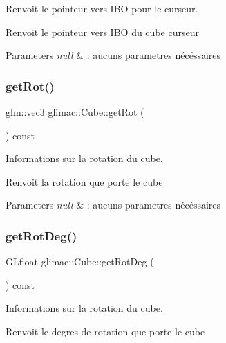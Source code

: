 Renvoit le pointeur vers I\+BO pour le curseur. 

Renvoit le pointeur vers I\+BO du cube curseur


\begin{DoxyParams}{Parameters}
{\em null} & \+: aucuns parametres nécéssaires \\
\hline
\end{DoxyParams}
\mbox{\label{classglimac_1_1Cube_a64f331e9a047ac8f9fe9f20e19a2c8e4}} 
\subsubsection{\texorpdfstring{get\+Rot()}{getRot()}}
{\footnotesize\ttfamily glm\+::vec3 glimac\+::\+Cube\+::get\+Rot (\begin{DoxyParamCaption}{ }\end{DoxyParamCaption}) const\hspace{0.3cm}{\ttfamily [inline]}}



Informations sur la rotation du cube. 

Renvoit la rotation que porte le cube


\begin{DoxyParams}{Parameters}
{\em null} & \+: aucuns parametres nécéssaires \\
\hline
\end{DoxyParams}
\mbox{\label{classglimac_1_1Cube_a0e97e0f3f757f5320edcc61f7bdbaaa1}} 
\subsubsection{\texorpdfstring{get\+Rot\+Deg()}{getRotDeg()}}
{\footnotesize\ttfamily G\+Lfloat glimac\+::\+Cube\+::get\+Rot\+Deg (\begin{DoxyParamCaption}{ }\end{DoxyParamCaption}) const\hspace{0.3cm}{\ttfamily [inline]}}



Informations sur la rotation du cube. 

Renvoit le degres de rotation que porte le cube


